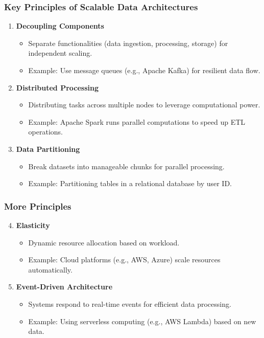 \documentclass[aspectratio=169]{beamer}
\begin{document}
\begin{frame}[fragile]
    \frametitle{Key Principles of Scalable Data Architectures}
    \begin{enumerate}
        \item \textbf{Decoupling Components}
            \begin{itemize}
                \item Separate functionalities (data ingestion, processing, storage) for independent scaling.
                \item Example: Use message queues (e.g., Apache Kafka) for resilient data flow.
            \end{itemize}
        \item \textbf{Distributed Processing}
            \begin{itemize}
                \item Distributing tasks across multiple nodes to leverage computational power.
                \item Example: Apache Spark runs parallel computations to speed up ETL operations.
            \end{itemize}
        \item \textbf{Data Partitioning}
            \begin{itemize}
                \item Break datasets into manageable chunks for parallel processing.
                \item Example: Partitioning tables in a relational database by user ID.
            \end{itemize}
    \end{enumerate}
\end{frame}

\begin{frame}[fragile]
    \frametitle{More Principles}
    \begin{enumerate}
        \setcounter{enumi}{3}
        \item \textbf{Elasticity}
            \begin{itemize}
                \item Dynamic resource allocation based on workload.
                \item Example: Cloud platforms (e.g., AWS, Azure) scale resources automatically.
            \end{itemize}
        \item \textbf{Event-Driven Architecture}
            \begin{itemize}
                \item Systems respond to real-time events for efficient data processing.
                \item Example: Using serverless computing (e.g., AWS Lambda) based on new data.
            \end{itemize}
    \end{enumerate}
\end{frame}
\end{document}
